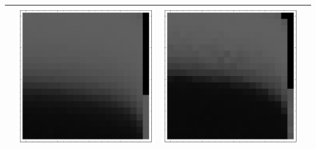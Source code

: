 \documentclass[10pt]{article}
\begin{document}
\begin{tabular}{|c|c|c|c|}
        & \includegraphics[scale=0.25]{plots/simple/LF-40S10S-20T10-MNIST-6.png}
        & \includegraphics[scale=0.25]{plots/simple/LF-40S20S10S-20T10-MNIST-6.png} \\ \hline

\end{tabular}
\end{document}
